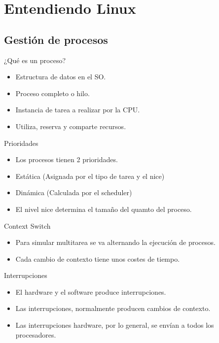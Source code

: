 \section{Entendiendo Linux}
\subsection{Gestión de procesos}
\begin{frame}{¿Qué es un proceso?}
	\begin{itemize}
		\item Estructura de datos en el SO.
		\item Proceso completo o hilo.
		\item Instancia de tarea a realizar por la CPU.
		\item Utiliza, reserva y comparte recursos.
	\end{itemize}
\end{frame}

\begin{frame}{Prioridades}
	\begin{itemize}
		\item Los procesos tienen 2 prioridades.
		\item Estática (Asignada por el tipo de tarea y el nice)
		\item Dinámica (Calculada por el scheduler)
		\item El nivel nice determina el tamaño del quamto del proceso.
	\end{itemize}
\end{frame}

\begin{frame}{Context Switch}
	\begin{itemize}
		\item Para simular multitarea se va alternando la ejecución de procesos.
		\item Cada cambio de contexto tiene unos costes de tiempo.
	\end{itemize}
\end{frame}

\begin{frame}{Interrupciones}
	\begin{itemize}
		\item El hardware y el software produce interrupciones.
		\item Las interrupciones, normalmente producen cambios de contexto.
		\item Las interrupciones hardware, por lo general, se envían a todos los procesadores.
	\end{itemize}
\end{frame}

